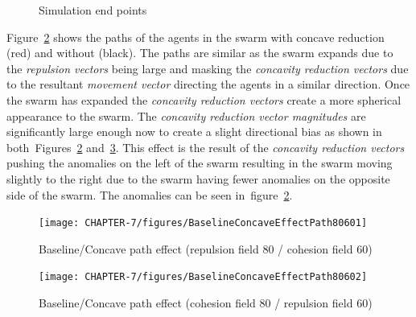 \begin{figure}[H]
\centering
{}
\caption{Simulation end points}
\label{fig:SimulationEndPoints}
\end{figure} 

Figure~\ref{concave:BaselineConcaveEffectPath80601} shows the paths of the agents in the swarm with concave reduction (red) and without (black). The paths are similar as the swarm expands due to the \textit{repulsion vectors} being large and masking the \textit{concavity reduction vectors} due to the resultant \textit{movement vector} directing the agents in a similar direction. Once the swarm has expanded the \textit{concavity reduction vectors} create a more spherical appearance to the swarm. The \textit{concavity reduction vector magnitudes} are significantly large enough now to create a slight directional bias as shown in both~Figures~\ref{concave:BaselineConcaveEffectPath80601} and~\ref{concave:BaselineConcaveEffectPath80602}. This effect is the result of the \textit{concavity reduction vectors} pushing the anomalies on the left of the swarm resulting in the swarm moving slightly to the right due to the swarm having fewer anomalies on the opposite side of the swarm. The anomalies can be seen in~figure~\ref{concave:BaselineConcaveEffectPath80601}.
\begin{figure}[H]
\begin{center}
\texttt{[image: CHAPTER-7/figures/BaselineConcaveEffectPath80601]}
\end{center}
\caption{Baseline/Concave path effect (repulsion field 80 / cohesion field 60)\label{concave:BaselineConcaveEffectPath80601}}
\end{figure}
\begin{figure}[H]
\begin{center}
\texttt{[image: CHAPTER-7/figures/BaselineConcaveEffectPath80602]}
\end{center}
\caption{Baseline/Concave path effect (cohesion field 80 / repulsion field 60)\label{concave:BaselineConcaveEffectPath80602}}
\end{figure}


